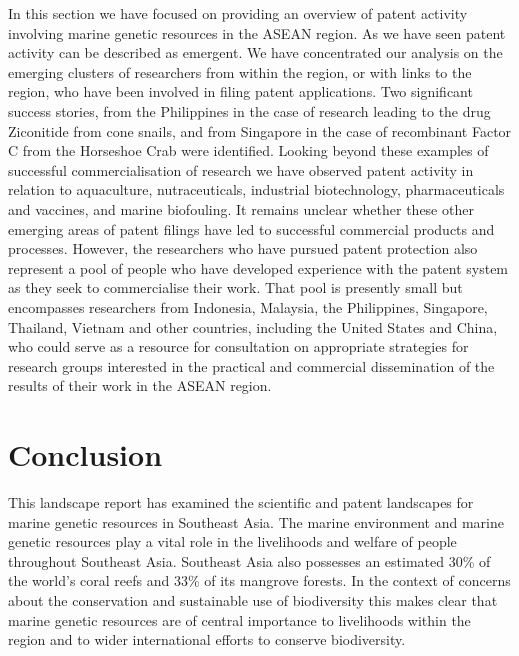 \documentclass[openany]{book}
\theoremstyle{definition}
\theoremstyle{definition}
\theoremstyle{definition}
\theoremstyle{remark}
\begin{document}
In this section we have focused on providing an overview of patent
activity involving marine genetic resources in the ASEAN region. As we
have seen patent activity can be described as emergent. We have
concentrated our analysis on the emerging clusters of researchers from
within the region, or with links to the region, who have been involved
in filing patent applications. Two significant success stories, from the
Philippines in the case of research leading to the drug Ziconitide from
cone snails, and from Singapore in the case of recombinant Factor C from
the Horseshoe Crab were identified. Looking beyond these examples of
successful commercialisation of research we have observed patent
activity in relation to aquaculture, nutraceuticals, industrial
biotechnology, pharmaceuticals and vaccines, and marine biofouling. It
remains unclear whether these other emerging areas of patent filings
have led to successful commercial products and processes. However, the
researchers who have pursued patent protection also represent a pool of
people who have developed experience with the patent system as they seek
to commercialise their work. That pool is presently small but
encompasses researchers from Indonesia, Malaysia, the Philippines,
Singapore, Thailand, Vietnam and other countries, including the United
States and China, who could serve as a resource for consultation on
appropriate strategies for research groups interested in the practical
and commercial dissemination of the results of their work in the ASEAN
region.

\hypertarget{conclusion-3}{%
\chapter{Conclusion}\label{conclusion-3}}

This landscape report has examined the scientific and patent landscapes
for marine genetic resources in Southeast Asia. The marine environment
and marine genetic resources play a vital role in the livelihoods and
welfare of people throughout Southeast Asia. Southeast Asia also
possesses an estimated 30\% of the world's coral reefs and 33\% of its
mangrove forests. In the context of concerns about the conservation and
sustainable use of biodiversity this makes clear that marine genetic
resources are of central importance to livelihoods within the region and
to wider international efforts to conserve biodiversity.
\end{document}
